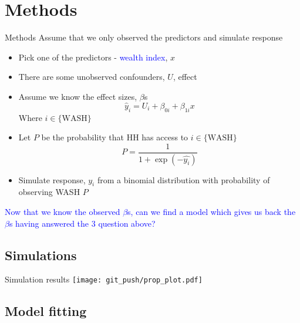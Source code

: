 \documentclass{beamer}
\begin{document}
\section{Methods}
\begin{frame}{Methods}
Assume that we only observed the predictors and simulate response
\begin{itemize}[<+->]
\item Pick one of the predictors - \textcolor{blue}{wealth index}, $x$
\item There are some unobserved confounders, $U$, effect
\item Assume we know the effect sizes, $\beta$s
\pause
\[
\hat{y}_i = U_i + \beta_{0i} + \beta_{1i}x
\]
Where $i\in\{\text{WASH}\}$
\item Let $P$ be the probability that HH has access to $i\in\{\text{WASH}\}$
\[
P = \frac{1}{1 + \exp{(-\hat{y_i})}}
\]
\item Simulate response, $y_i$ from a binomial distribution with probability of observing WASH $P$
\end{itemize}
\pause
\textcolor{blue}{Now that we know the observed $\beta$s, can we find a model which gives us back the $\beta$s having answered the 3 question above?}
\end{frame}

\subsection{Simulations}
\begin{frame}{Simulation results}
\centering
\texttt{[image: git\_push/prop\_plot.pdf]}
\end{frame}

\subsection{Model fitting}
\end{document}
